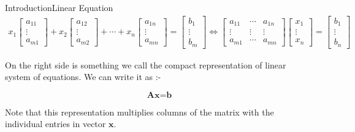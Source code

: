 \documentclass[10pt]{beamer}
\begin{document}
\begin{frame}[shrink=20]{Introduction}{Linear Equation}
\begin{align}
x_{1}\begin{bmatrix}a_{11}\\\vdots\\a_{m1}\end{bmatrix}+x_{2}\begin{bmatrix}a_{12}\\\vdots\\a_{m2}\end{bmatrix}+\cdots+x_{n}\begin{bmatrix}a_{1n}\\\vdots\\a_{mn}\end{bmatrix} = \begin{bmatrix}b_{1}\\\vdots\\b_{m}\end{bmatrix} \Leftrightarrow   \begin{bmatrix} a_{11} & \cdots & a_{1n}\\ \vdots & \vdots & \vdots \\ a_{m1} & \cdots & a_{mn}\end{bmatrix} \begin{bmatrix} x_{1}\\ \vdots \\ x_{n}\end{bmatrix}=\begin{bmatrix} b_{1}\\ \vdots \\ b_{n}\end{bmatrix}
\end{align}

On the right side is something we call the compact representation of linear system of equations. We can write it as :-

$$ \textbf{A}\textbf{x} = \textbf{b}$$

Note that this representation multiplies columns of the matrix with the individual entries in vector $\textbf{x}$.

\end{frame}



\end{document}
